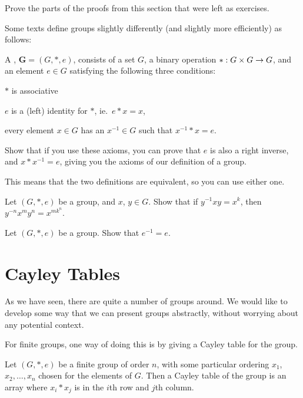 \begin{exercises}
  \item Prove the parts of the proofs from this section that were left as
    exercises.

  \item Some texts define groups slightly differently (and slightly more
    efficiently) as follows:
    
    A , $\mathbf{G} = (G, \ast, e)$, consists of a set $G$,
    a binary operation $\ast: G \times G \to G$, and an element $e \in G$
    satisfying the following three conditions:
    \begin{theoremenum}
      \item $\ast$ is associative
      \item $e$ is a (left) identity for $\ast$, ie.\ $e \ast x = x$,
      \item every element $x \in G$ has an  $x^{-1} \in G$
        such that $x^{-1} \ast x = e$.
   \end{theoremenum}
   
   Show that if you use these axioms, you can prove that $e$ is also a right
   inverse, and $x \ast x^{-1} = e$, giving you the axioms of our definition
   of a group.
   
   This means that the two definitions are equivalent, so you can use either
   one.
   
  \item Let $(G, \ast, e)$ be a group, and $x$, $y \in G$.  Show that if
  $y^{-1}xy = x^{k}$, then $y^{-n}x^{m}y^{n} = x^{mk^{n}}$.
  
  \item Let $(G, \ast, e)$ be a group.  Show that $e^{-1} = e$.

\end{exercises}

\section{Cayley Tables}

As we have seen, there are quite a number of groups around.  We would like
to develop some way that we can present groups abstractly, without worrying
about any potential context.

For finite groups, one way of doing this is by giving a Cayley table for the
group.

\begin{definition}
  Let $(G, \ast, e)$ be a finite group of order $n$, with some particular
  ordering $x_{1}$, $x_{2}, \ldots, x_{n}$ chosen for the elements of $G$.
  Then a Cayley table of the group is an array where $x_{i} \ast x_{j}$ is
  in the $i$th row and $j$th column.
\end{definition}

